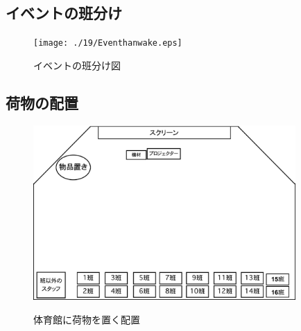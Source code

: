\subsection{イベントの班分け}
\begin{figure}[h]
\begin{center}
\texttt{[image: ./19/Eventhanwake.eps]}
\label{fig:Eventhanwake}
\caption{イベントの班分け図}
\end{center}
\end{figure}


\subsection{荷物の配置}
\begin{figure}[h]
\begin{center}
\includegraphics[width = 10cm]{./19/nimotu2.eps}
\label{fig:nimotu2}
\caption{体育館に荷物を置く配置}
\end{center}
\end{figure}



%
